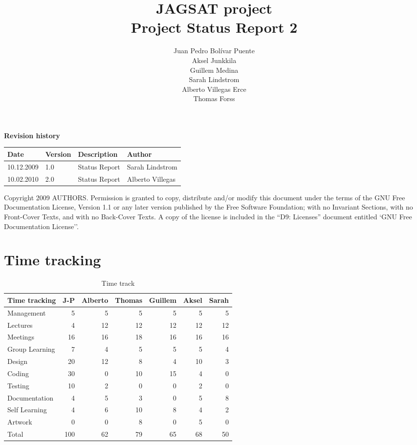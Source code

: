 \documentclass[12pt,a4paper]{article}
\title{\large JAGSAT project\\\huge Project Status Report 2}
\author{
  Juan Pedro Bolívar Puente\\ 
  Aksel Junkkila\\
  Guillem Medina\\ 
  Sarah Lindstrom\\ 
  Alberto Villegas Erce\\ 
  Thomas Forss
}
\begin{document}
\maketitle

\begin{center}
\textbf{Revision history}

\begin{tabular}{ l | l | l | l }
Date			&Version	&Description		&Author\\\hline\hline
10.12.2009	&1.0		&Status Report		&Sarah Lindstrom\\
10.02.2010	&2.0		&Status Report		&Alberto Villegas
\end{tabular}
\label{tab:rev}
\end{center}

\vfill
Copyright 2009 AUTHORS.
Permission is granted to copy, distribute and/or modify this document under the terms of the GNU Free Documentation License, Version 1.1 or any later version published by the Free Software Foundation;  with no Invariant Sections, with no Front-Cover Texts, and with no Back-Cover Texts. A copy of the license is included in the ``D9: Licenses''  document entitled `GNU Free Documentation License''.

\pagebreak
\tableofcontents
\pagebreak

\section{Time tracking}

\begin{table}[h!]
\small
\begin{tabular}{ l | r | r | r | r | r | r}
Time tracking	&J-P	&Alberto	&Thomas	&Guillem	&Aksel	&Sarah\\\hline\hline
Management	&5	&5		&5		&5		&5		&5\\
Lectures		&4	&12		&12		&12		&12		&12\\
Meetings		&16	&16		&18		&16		&16		&16\\
Group Learning&7	&4		&5		&5		&5		&4\\
Design		&20	&12		&8		&4		&10		&3\\
Coding		&30	&0		&10		&15		&4		&0\\
Testing		&10	&2		&0		&0		&2		&0\\
Documentation&4	&5		&3		&0		&5		&8\\
Self Learning	&4	&6		&10		&8		&4		&2\\
Artwork		&0	&0		&8		&0		&5		&0\\
Total			&100&62		&79		&65		&68		&50
\end{tabular}
\caption{Time track}
\label{tab:timetrack}
\end{table}
\end{document}
